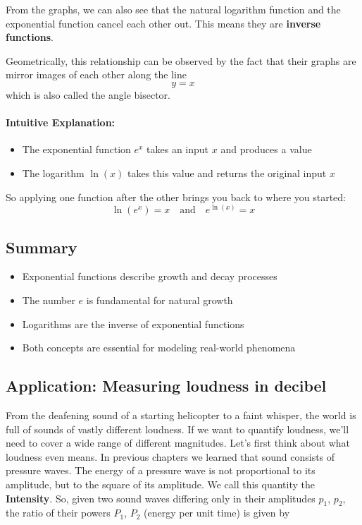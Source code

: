 
From the graphs, we can also see that the natural logarithm function and the exponential function cancel each other out. This means they are \textbf{inverse functions}.

Geometrically, this relationship can be observed by the fact that their graphs are mirror images of each other along the line
\begin{equation}
    y = x
\end{equation}
which is also called the angle bisector.

\paragraph{Intuitive Explanation:}
\begin{itemize}
    \item The exponential function $e^x$ takes an input $x$ and produces a value
    \item The logarithm $\ln(x)$ takes this value and returns the original input $x$
\end{itemize}

So applying one function after the other brings you back to where you started:
\begin{equation}
    \ln(e^x) = x \quad \text{and} \quad e^{\ln(x)} = x
\end{equation}

\subsection{Summary}

\begin{itemize}
    \item Exponential functions describe growth and decay processes
    \item The number $e$ is fundamental for natural growth
    \item Logarithms are the inverse of exponential functions
    \item Both concepts are essential for modeling real-world phenomena
\end{itemize}

\subsection{Application: Measuring loudness in decibel}

From the deafening sound of a starting helicopter to a faint whisper, the world is full of sounds of vastly different loudness. If we want to quantify loudness, we'll need to cover a wide range of different magnitudes. Let's first think about what loudness even means. In previous chapters we learned that sound consists of pressure waves. The energy of a pressure wave is not proportional to its amplitude, but to the square of its amplitude. We call this quantity the \textbf{Intensity}. So, given two sound waves differing only in their amplitudes $p_1$, $p_2$, the ratio of their powers $P_1$, $P_2$ (energy per unit time) is given by

